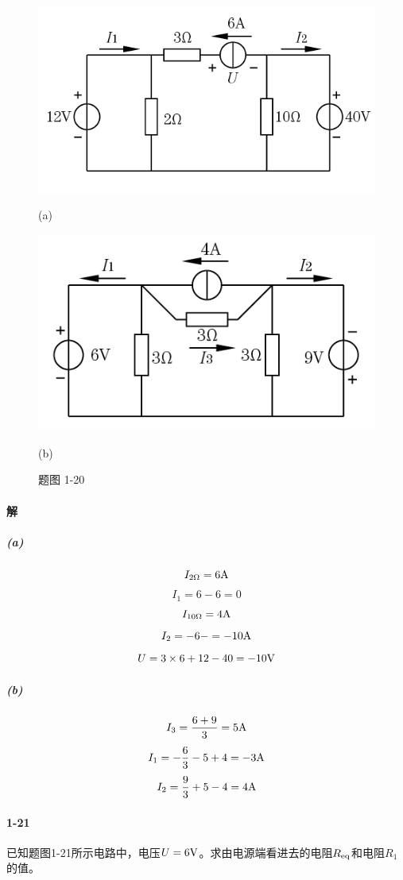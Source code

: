 \documentclass[hyperref, UTF8]{ctexart}
\begin{document}
\begin{figure}[!htb]
  \centering
  \begin{minipage}[t]{0.359\textwidth}
    \centering
    \includegraphics[width=1\textwidth]{p1-20-a.png}
    \caption*{(a)}
  \end{minipage}
  \begin{minipage}[t]{0.317\textwidth}
    \centering
    \includegraphics[width=1\textwidth]{p1-20-b.png}
    \caption*{(b)}
  \end{minipage}
  \caption*{题图 1-20}
\end{figure}

\paragraph{解}
\subparagraph{(a)}
$$ I_{2\Omega}=6{\rm A}$$
$$ I_1=6-6=0 $$
$$ I_{10\Omega}=4{\rm A}$$
$$ I_2=-6-=-10{\rm A}$$
$$ U=3 \times 6 + 12 - 40 = -10 {\rm V} $$
\subparagraph{(b)}
$$ I_3=\frac{6+9}{3}=5{\rm A} $$
$$ I_1=-\frac{6}{3} - 5 + 4 = -3 {\rm A} $$
$$ I_2=\frac{9}{3}+5-4=4{\rm A} $$

\paragraph{1-21} \label{1-21}
已知题图1-21所示电路中，电压$U=6{\rm V}$。求由电源端看进去的电阻$R_{\rm eq}$和电阻$R_1$的值。
\end{document}
